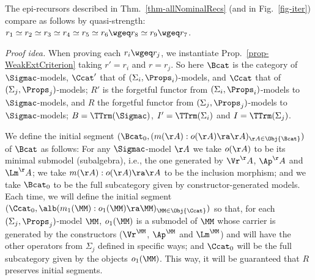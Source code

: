 \begin{thm} \rm
	\label{thm-qexpr}
	The epi-recursors described in Thm.~\ref{thm-allNominalRecs} (and in Fig.~\ref{fig-iter}) compare as follows by quasi-strength: \ \ 
	$
	r_1 \simeq r_2 \simeq  r_3 \simeq  r_4 \simeq  r_5 \simeq  r_6  
	\wgeq 
	r_8 \simeq r_9  \wgeq r_7  
	$. 
\end{thm} 
\emph{Proof idea. } 
%
%
%
When proving each 
$r_i \wgeq r_j$, we instantiate Prop.~\ref{prop-WeakExtCriterion} %
taking $r' = r_i$ and $r = r_j$. So here $\Bcat$ is the category of $\Sigmac$-models, $\Ccat'$ that of $(\Sigma_i,\Props_i)$-models, 
and $\Ccat$ that of $(\Sigma_j,\Props_j)$-models; $R'$ 
is the forgetful functor from $(\Sigma_i,\Props_i)$-models to $\Sigmac$-models, and $R$ the forgetful functor from $(\Sigma_j,\Props_j)$-models to $\Sigmac$-models; 
$B=\TTrm(\Sigmac)$, 
$I'=\TTrm(\Sigma_i)$ and $I=\TTrm(\Sigma_j)$.  

We define the initial segment $(\Bcat_0,(m(\AA):o(\AA)\ra \AA)_{\AA \in \Obj{\Bcat}})$ of $\Bcat$ as follows: For any $\Sigmac$-model $\AA$ %
we take 
$o(\AA)$ to be its minimal submodel (subalgebra), 
i.e., the one generated by 
$\Vr^\AA$, $\Ap^\AA$ and $\Lm^\AA$; we take $m(\AA): o(\AA) \ra \AA$ to be the inclusion morphism; and we take $\Bcat_0$ to be the full subcategory given by constructor-generated models. 
%
Each time, we will define the initial segment $(\Ccat_0,\alb(m_1(\MM):o_1(\MM)\ra \MM)_{\MM \in \Obj{\Ccat}})$ 
so that, for each $(\Sigma_j,\Props_j)$-model $\MM$, 
$o_1(\MM)$ is a submodel of $\MM$ whose carrier is generated by the constructors ($\Vr^\MM$, $\Ap^\MM$ and $\Lm^\MM$) and will have the other operators from $\Sigma_j$ defined in specific ways; and $\Ccat_0$ will be the full subcategory given by the objects $o_1(\MM)$. 
%
This way, it will be guaranteed that $R$ preserves initial segments. 
\looseness=-1

